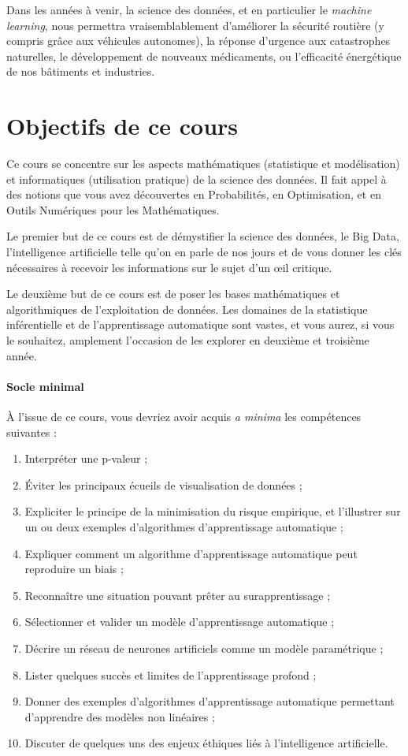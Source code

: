 Dans les années à venir, la science des données, et en particulier le
\textit{machine learning}, nous permettra vraisemblablement d'améliorer la
sécurité routière (y compris grâce aux véhicules autonomes), la réponse
d'urgence aux catastrophes naturelles, le développement de nouveaux
médicaments, ou l'efficacité énergétique de nos bâtiments et industries.



\section{Objectifs de ce cours}
Ce cours se concentre sur les aspects mathématiques (statistique et
modélisation) et informatiques (utilisation pratique) de la science des
données. Il fait appel à des notions que vous avez découvertes en Probabilités,
en Optimisation, et en Outils Numériques pour les Mathématiques.

Le premier but de ce cours est de démystifier la science des données, le Big
Data, l'intelligence artificielle telle qu'on en parle de nos jours et de vous
donner les clés nécessaires à recevoir les informations sur le sujet d'un
\oe{}il critique.

Le deuxième but de ce cours est de poser les bases mathématiques et
algorithmiques de l'exploitation de données. Les domaines de la statistique
inférentielle et de l'apprentissage automatique sont vastes, et vous aurez, si
vous le souhaitez, amplement l'occasion de les explorer en deuxième et troisième
année.

\paragraph{Socle minimal} 
À l'issue de ce cours, vous devriez avoir acquis
\textit{a minima} les compétences suivantes :
\begin{enumerate}
\item Interpréter une p-valeur ;
\item Éviter les principaux écueils de visualisation de données ;
\item Expliciter le principe de la minimisation du risque empirique, et
  l'illustrer sur un ou deux exemples d'algorithmes d'apprentissage automatique ;
\item Expliquer comment un algorithme d'apprentissage automatique peut
  reproduire un biais  ;
\item Reconnaître une situation pouvant prêter au surapprentissage ;
\item Sélectionner et valider un modèle d'apprentissage automatique ;
\item Décrire un réseau de neurones artificiels comme un modèle paramétrique ;
\item Lister quelques succès et limites de l'apprentissage profond ;
\item Donner des exemples d'algorithmes d'apprentissage automatique permettant
  d'apprendre des modèles non linéaires ;
\item Discuter de quelques uns des enjeux éthiques liés à l'intelligence
  artificielle.
\end{enumerate}

